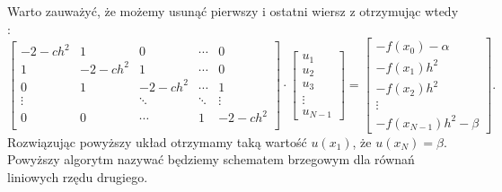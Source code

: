 \documentclass[12pt,a4paper]{report}
\begin{document}
Warto zauważyć, że możemy usunąć pierwszy i ostatni wiersz z otrzymując  wtedy :
$$
\left[ \begin{array}{ccccc}
-2-ch^2 & 1 & 0 & \cdots & 0 \\
1 & -2-ch^2 & 1& \cdots & 0 \\
0 & 1 & -2-ch^2& \cdots & 1 \\
\vdots &  & \ddots & \ddots & \vdots \\ 
0 & 0 & \cdots & 1 & -2-ch^2 \\
\end{array} \right] \cdot
\left[ \begin{array}{c}
u_1 \\
u_2 \\
u_3 \\
\vdots \\
u_{N-1} 
\end{array} \right] =
\left[ \begin{array}{c}
-f(x_0)-\alpha \\
-f(x_1)h^2 \\
-f(x_2)h^2\\
\vdots \\
-f(x_{N-1})h^2 -\beta    
\end{array} \right] . 
$$
Rozwiązując powyższy układ otrzymamy taką wartość $u(x_1)$, że $u(x_N) = \beta$. Powyższy algorytm nazywać będziemy schematem brzegowym dla równań liniowych rzędu drugiego. 
\end{document}
